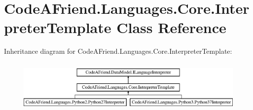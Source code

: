 \hypertarget{class_code_a_friend_1_1_languages_1_1_core_1_1_interpreter_template}{}\section{Code\+A\+Friend.\+Languages.\+Core.\+Interpreter\+Template Class Reference}
\label{class_code_a_friend_1_1_languages_1_1_core_1_1_interpreter_template}
Inheritance diagram for Code\+A\+Friend.\+Languages.\+Core.\+Interpreter\+Template\+:\begin{figure}[H]
\begin{center}
\leavevmode
\includegraphics[height=2.560976cm]{class_code_a_friend_1_1_languages_1_1_core_1_1_interpreter_template}
\end{center}
\end{figure}
